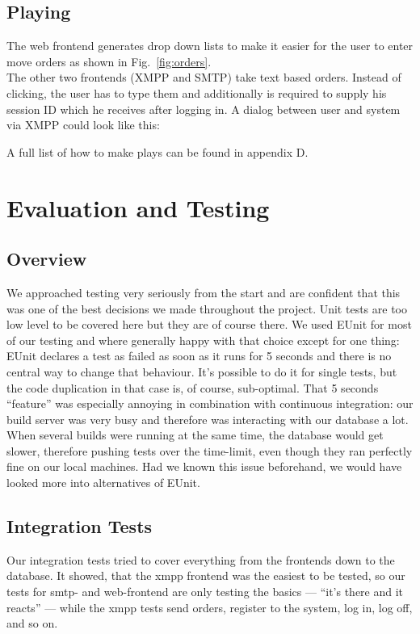 \documentclass[11pt,a4paper]{report}
\newcommand{\hi}[1]{{\color{red}\em #1\/}\\}
\begin{document}
\section{Playing}
The web frontend generates drop down lists to make it easier for the user to
enter move orders as shown in Fig.~\ref{fig:orders}. \\
The other two frontends (XMPP and SMTP) take text based orders. Instead of
clicking, the user has to type them and additionally is required to supply
his session ID which he receives after logging in. A dialog between user and
system via XMPP could look like this:

A full list of how to make plays can be found in appendix D.

\chapter{Evaluation and Testing}
\section{Overview}
We approached testing very seriously from the start and are confident that this
was one of the best decisions we made throughout the project. Unit tests are too
low level to be covered here but they are of course there. We used EUnit for
most of our testing and where generally happy with that choice except for one
thing: EUnit declares a test as failed as soon as it runs for 5 seconds and
there is no central way to change that behaviour. It's possible to do it for
single tests, but the code duplication in that case is, of course, sub-optimal.
That 5 seconds ``feature'' was especially annoying in combination with
continuous integration: our build server was very busy and therefore was
interacting with our database a lot. When several builds were running at the
same time, the database would get slower, therefore pushing tests over the
time-limit, even though they ran perfectly fine on our local machines. Had we
known this issue beforehand, we would have looked more into alternatives of
EUnit.

\section{Integration Tests}
Our integration tests tried to cover everything from the frontends down to the
database. It showed, that the xmpp frontend was the easiest to be tested, so
our tests for smtp- and web-frontend are only testing the basics --- ``it's
there and it reacts'' --- while the xmpp tests send orders, register to the
system, log in, log off, and so on.
\end{document}
